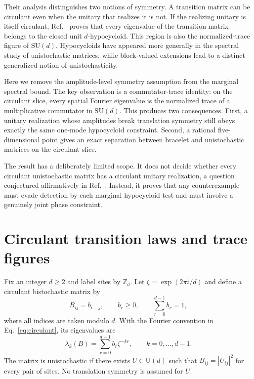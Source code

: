 \documentclass[aip,jmp,preprint,onecolumn,nofootinbib]{revtex4-2}
\begin{document}
Their analysis distinguishes two notions of symmetry.  A transition matrix can
be circulant even when the unitary that realizes it is not.  If the realizing
unitary is itself circulant, Ref.~ proves that
every eigenvalue of the transition matrix belongs to the closed unit
$d$-hypocycloid.  This region is also the normalized-trace figure of
$\mathrm{SU}(d)$.\cite{Kaiser2006}  Hypocycloids have appeared more generally
in the spectral study of unistochastic matrices,\cite{Zyczkowski2003} while
block-valued extensions lead to a distinct generalized notion of
unistochasticity.\cite{Nechita2025}

Here we remove the amplitude-level symmetry assumption from the marginal
spectral bound.  The key observation is a commutator-trace identity: on the
circulant slice, every spatial Fourier eigenvalue is the normalized trace of a
multiplicative commutator in $\mathrm{SU}(d)$.  This produces two consequences.
First, a unitary realization whose amplitudes break translation symmetry still
obeys exactly the same one-mode hypocycloid constraint.  Second, a rational
five-dimensional point gives an exact separation between bracelet and
unistochastic matrices on the circulant slice.

The result has a deliberately limited scope.  It does not decide whether every
circulant unistochastic matrix has a circulant unitary realization, a question
conjectured affirmatively in Ref.~.  Instead,
it proves that any counterexample must evade detection by each marginal
hypocycloid test and must involve a genuinely joint phase constraint.

\section{Circulant transition laws and trace figures}

Fix an integer $d\geq 2$ and label sites by $\mathbb Z_d$.  Let
$\zeta=\exp(2\pi i/d)$ and define a circulant bistochastic matrix by
\begin{equation}
 B_{ij}=b_{i-j},\qquad b_r\geq 0,\qquad
 \sum_{r=0}^{d-1}b_r=1,
 \label{eq:circulant}
\end{equation}
where all indices are taken modulo $d$.  With the Fourier convention in
Eq.~\eqref{eq:circulant}, its eigenvalues are
\begin{equation}
 \lambda_k(B)=\sum_{r=0}^{d-1}b_r\zeta^{-kr},
 \qquad k=0,\ldots,d-1.
 \label{eq:fourier-eigenvalue}
\end{equation}
The matrix is unistochastic if there exists $U\in \mathrm U(d)$ such that
$B_{ij}=|U_{ij}|^2$ for every pair of sites.  No translation symmetry is
assumed for $U$.
\end{document}
